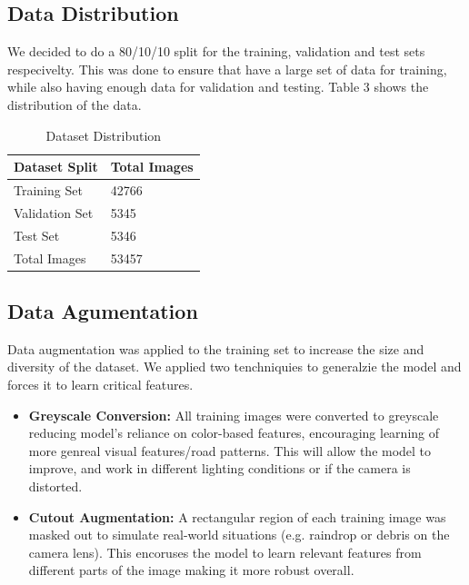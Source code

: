 \documentclass{article} %
\begin{document}
\subsection{Data Distribution}
We decided to do a 80/10/10 split for the training, validation and test sets respecivelty. This was done to ensure that have a
large set of data for training, while also having enough data for validation and testing. Table 3 shows the distribution of the data.

\begin{table}[h]
\centering
\caption{Dataset Distribution}
\vspace{0.5em}
\begin{tabular}{|p{2cm}|p{2cm}|}
\hline
\textbf{Dataset Split} & \textbf{Total Images} \\ \hline
Training Set           & 42766 \\ \hline
Validation Set         & 5345 \\ \hline
Test Set               & 5346 \\ \hline
Total Images           & 53457  \\ \hline
\end{tabular}
\end{table}


\subsection{Data Agumentation}

Data augmentation was applied to the training set to increase the size and diversity of the dataset. We applied two tenchniquies to generalzie the model and forces
it to learn critical features. 

\begin{itemize}
  \item \textbf{Greyscale Conversion:} All training images were converted to greyscale reducing model's reliance on color-based features, encouraging learning of more genreal visual features/road patterns. This will allow the model to improve, and work in different lighting conditions or if the camera is distorted.

  \item \textbf{Cutout Augmentation:} A rectangular region of each training image was masked out to simulate real-world situations (e.g. raindrop or debris on the camera lens). This encoruses the model to learn relevant features from different parts of the image making it more robust overall. 
\end{itemize}
\end{document}
